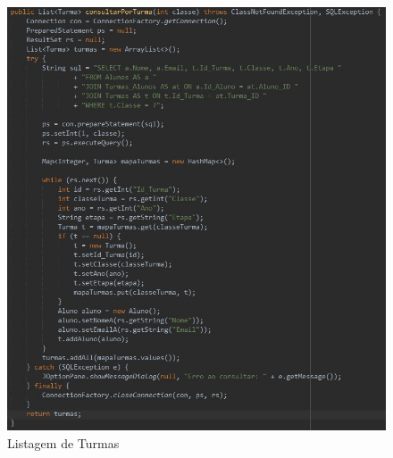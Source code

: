 \documentclass[main.tex]{subfiles}
\begin{document}
\begin{figure}[H]
    \centering
    \includegraphics[scale=0.8]{imagens/code_scrs/14-listarTurma}
    \caption{Listagem de Turmas}
\end{figure}
\end{document}
